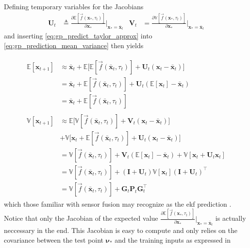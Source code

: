 Defining temporary variables for the Jacobians
\begin{align}
    \boldsymbol{U}_t & \triangleq \frac{\partial  \mathbb{E}[\vec{f}(\boldsymbol{x}_*, \tau_t)]}{\partial \boldsymbol{x}_*}\big|_{\boldsymbol{x}_* = \bar{\boldsymbol{x}}_t} & \boldsymbol{V}_t & =\frac{\partial \mathbb{V}[\vec{f}(\boldsymbol{x}_*, \tau_t)]}{\partial \boldsymbol{x}_*}\big|_{\boldsymbol{x}_* = \bar{\boldsymbol{x}}_t}
\end{align}
and inserting \cref{eq:gp_predict_taylor_approx} into \cref{eq:gp_prediction_mean_variance} then yields

\begin{subequations}\label{eq:gp_prediction_mean_variance_final}
    \begin{align}
        \begin{split}
            \mathbb{E}[\boldsymbol{x}_{t+1}] & \approx \bar{\boldsymbol{x}}_t +  \mathbb{E}\big[ \mathbb{E}[\vec{f}(\bar{\boldsymbol{x}}_t, \tau_t)] + \boldsymbol{U}_t (\boldsymbol{x}_t - \bar{\boldsymbol{x}}_t)\big]\\
            &= \bar{\boldsymbol{x}}_t + \mathbb{E}[\vec{f}(\bar{\boldsymbol{x}}_t, \tau_t)] + \boldsymbol{U}_t ( \mathbb{E}[\boldsymbol{x}_t] - \bar{\boldsymbol{x}}_t)\\
            &= \bar{\boldsymbol{x}}_t + \mathbb{E}[\vec{f}(\bar{\boldsymbol{x}}_t, \tau_t)]
        \end{split} \\
        \begin{split}
            \mathbb{V}[\boldsymbol{x}_{t+1}] &\approx \mathbb{E}\big[\mathbb{V}[\vec{f}(\bar{\boldsymbol{x}}_t, \tau_t)] + \boldsymbol{V}_t (\boldsymbol{x}_t - \bar{\boldsymbol{x}}_t) \big]\\
            &+\mathbb{V}\big[ \boldsymbol{x}_t + \mathbb{E}[\vec{f}(\bar{\boldsymbol{x}}_t, \tau_t)] +  \boldsymbol{U}_t (\boldsymbol{x}_t - \bar{\boldsymbol{x}}_t)  \big]\\
            &=\mathbb{V}[\vec{f}(\bar{\boldsymbol{x}}_t, \tau_t)] + \boldsymbol{V}_t (\mathbb{E}[\boldsymbol{x}_t] - \bar{\boldsymbol{x}}_t) +\mathbb{V}[\boldsymbol{x}_t + \boldsymbol{U}_t  \boldsymbol{x}_t] \\
            &= \mathbb{V}[\vec{f}(\bar{\boldsymbol{x}}_t, \tau_t)] + (\boldsymbol{I} + \boldsymbol{U}_t) \mathbb{V}[\boldsymbol{x}_t] (\boldsymbol{I} + \boldsymbol{U}_t)^\intercal\\
            &= \mathbb{V}[\vec{f}(\bar{\boldsymbol{x}}_t, \tau_t)] + \boldsymbol{G}_t \boldsymbol{P}_t \boldsymbol{G}_t^\intercal
        \end{split}
    \end{align}
\end{subequations}
which those familiar with sensor fusion may recognize as the \acrfull{ekf} prediction \cite{gpekf}. Notice that only the Jacobian of the expected value $\frac{\partial  \mathbb{E}[\vec{f}(\boldsymbol{x}_*, \tau_t)]}{\partial \boldsymbol{x}_*}\big|_{\boldsymbol{x}_* = \bar{\boldsymbol{x}}_t}$ is actually neccessary in the end. This Jacobian is easy to compute and only relies on the covariance between the test point $\boldsymbol{\nu}_*$ and the training inputs as expressed in


